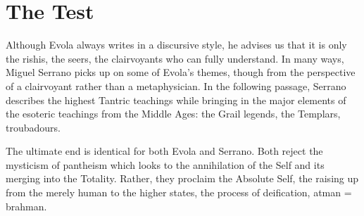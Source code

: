 \section{The Test}

Although Evola always writes in a discursive style, he advises us that it is only the rishis, the seers, the clairvoyants who can fully understand. In many ways, Miguel Serrano picks up on some of Evola's themes, though from the perspective of a clairvoyant rather than a metaphysician. In the following passage, Serrano describes the highest Tantric teachings while bringing in the major elements of the esoteric teachings from the Middle Ages: the Grail legends, the Templars, troubadours.

The ultimate end is identical for both Evola and Serrano. Both reject the mysticism of pantheism which looks to the annihilation of the Self and its merging into the Totality. Rather, they proclaim the Absolute Self, the raising up from the merely human to the higher states, the process of deification, atman = brahman.

